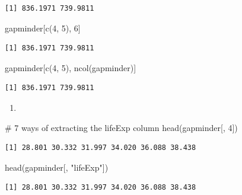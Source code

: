 \documentclass[
  letterpaper,
  DIV=11,
  numbers=noendperiod]{scrreprt}
\newenvironment{Shaded}{\begin{snugshade}}{\end{snugshade}}
\newcommand{\CommentTok}[1]{\textcolor[rgb]{0.37,0.37,0.37}{#1}}
\newcommand{\DecValTok}[1]{\textcolor[rgb]{0.68,0.00,0.00}{#1}}
\newcommand{\FunctionTok}[1]{\textcolor[rgb]{0.28,0.35,0.67}{#1}}
\newcommand{\NormalTok}[1]{\textcolor[rgb]{0.00,0.23,0.31}{#1}}
\newcommand{\StringTok}[1]{\textcolor[rgb]{0.13,0.47,0.30}{#1}}
\providecommand{\tightlist}{%
  \setlength{\itemsep}{0pt}\setlength{\parskip}{0pt}}\usepackage{longtable,booktabs,array}
\begin{document}
\begin{verbatim}
[1] 836.1971 739.9811
\end{verbatim}

\begin{Shaded}
\begin{Highlighting}[]
\NormalTok{gapminder[}\FunctionTok{c}\NormalTok{(}\DecValTok{4}\NormalTok{, }\DecValTok{5}\NormalTok{), }\DecValTok{6}\NormalTok{]}
\end{Highlighting}
\end{Shaded}

\begin{verbatim}
[1] 836.1971 739.9811
\end{verbatim}

\begin{Shaded}
\begin{Highlighting}[]
\NormalTok{gapminder[}\FunctionTok{c}\NormalTok{(}\DecValTok{4}\NormalTok{, }\DecValTok{5}\NormalTok{), }\FunctionTok{ncol}\NormalTok{(gapminder)]}
\end{Highlighting}
\end{Shaded}

\begin{verbatim}
[1] 836.1971 739.9811
\end{verbatim}

\begin{enumerate}
\def\labelenumi{\arabic{enumi}.}
\setcounter{enumi}{1}
\tightlist
\item
\end{enumerate}

\begin{Shaded}
\begin{Highlighting}[]
\CommentTok{\# 7 ways of extracting the lifeExp column}
\FunctionTok{head}\NormalTok{(gapminder[, }\DecValTok{4}\NormalTok{])}
\end{Highlighting}
\end{Shaded}

\begin{verbatim}
[1] 28.801 30.332 31.997 34.020 36.088 38.438
\end{verbatim}

\begin{Shaded}
\begin{Highlighting}[]
\FunctionTok{head}\NormalTok{(gapminder[, }\StringTok{"lifeExp"}\NormalTok{])}
\end{Highlighting}
\end{Shaded}

\begin{verbatim}
[1] 28.801 30.332 31.997 34.020 36.088 38.438
\end{verbatim}
\end{document}
